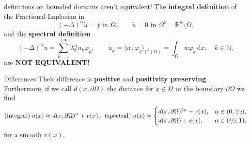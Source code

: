 \documentclass[aspectratio=169,xcolor=dvipsnames]{beamer}
\begin{document}
	\begin{frame}{\alert{\faSadTear}\;definitions on bounded domains aren't equivalent!}
	The \alert{\textbf{integral definition}} of the Fractional Laplacian in 
	\[(-\Delta)^\alpha \tilde{u} = f \text{ in }\Omega, \qquad \tilde{u} = 0 \text{ in } \Omega^c = \mathbb{R}^n \setminus \Omega,\]
	and the \alert{\textbf{spectral definition}} 
	\[
	(-\Delta)^\alpha u = \sum_{k=1}^{+\infty} \lambda_k^\alpha u_k \varphi_k, \qquad u_k = \langle w , \varphi_k \rangle_{\mathbb{L}^2(\Omega)} = \int_{\Omega} w \varphi_k \,\mathrm{d}x, \quad k \in \mathbb{N},
	\]
	are \alert{\textbf{NOT EQUIVALENT}}!
	
	\begin{exampleblock}{Differences}\small
	Their difference is \textbf{positive} and \textbf{positivity preserving} \parencite[Theorems~1 and 2]{MR3246044}. Furthermore, if we call $d(x,\partial\Omega)$ the distance for $x \in \Omega$ to the boundary $\partial \Omega$ we find\vspace{-0.5em}
	\[
	\text{(integral)}\;u(x) \approx d(x,\partial\Omega)^\alpha + v(x), \;\; \text{(spectral)}\; u(x) \approx \begin{cases}
	d(x,\partial\Omega)^{2\alpha}  + v(x), & \alpha \in(0,\nicefrac{1}{2}),\\
	d(x,\partial\Omega)  + v(x), & \alpha \in (\nicefrac{1}{2},1),
	\end{cases}\vspace{-0.5em}
	\] 
	for a smooth $v(x)$.
	\end{exampleblock}
	
	\end{frame}
\end{document}
